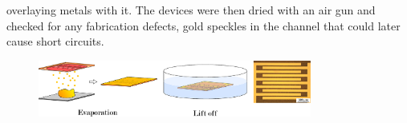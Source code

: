 overlaying metals with it. The devices were then dried with an air gun and checked for any fabrication defects, \eg{} gold speckles in the channel that could later cause short circuits.

\begin{figure}[h]
    \centering
    \includegraphics[width=0.8\textwidth]{figures/chapter2/litho/Fig9_evap.pdf}
    \caption{}
    \label{fig:evap}
\end{figure}
